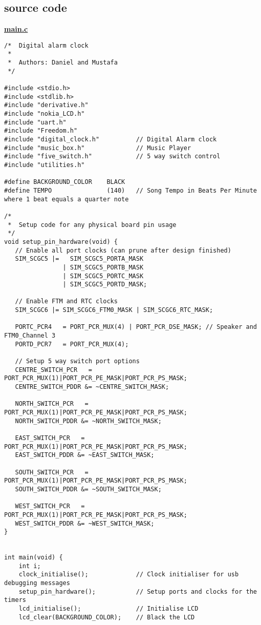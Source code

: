 \documentclass{article}
\begin{document}
\begin{landscape}
\section{source code}
\bf{\underline{main.c}}
\begin{lstlisting}[frame=single]
/*	Digital alarm clock
 * 
 * 	Authors: Daniel and Mustafa
 */

#include <stdio.h>
#include <stdlib.h>
#include "derivative.h"
#include "nokia_LCD.h"
#include "uart.h"
#include "Freedom.h"
#include "digital_clock.h"			// Digital Alarm clock
#include "music_box.h"				// Music Player
#include "five_switch.h"			// 5 way switch control
#include "utilities.h"

#define BACKGROUND_COLOR 	BLACK
#define TEMPO				(140)	// Song Tempo in Beats Per Minute where 1 beat equals a quarter note

/*
 *  Setup code for any physical board pin usage
 */
void setup_pin_hardware(void) {
   // Enable all port clocks (can prune after design finished)
   SIM_SCGC5 |=   SIM_SCGC5_PORTA_MASK
		   	   	| SIM_SCGC5_PORTB_MASK
		   	   	| SIM_SCGC5_PORTC_MASK
		   	   	| SIM_SCGC5_PORTD_MASK;
   
   // Enable FTM and RTC clocks
   SIM_SCGC6 |= SIM_SCGC6_FTM0_MASK | SIM_SCGC6_RTC_MASK;
   
   PORTC_PCR4	= PORT_PCR_MUX(4) | PORT_PCR_DSE_MASK; // Speaker and FTM0_Channel 3
   PORTD_PCR7	= PORT_PCR_MUX(4);
   
   // Setup 5 way switch port options
   CENTRE_SWITCH_PCR   = PORT_PCR_MUX(1)|PORT_PCR_PE_MASK|PORT_PCR_PS_MASK;
   CENTRE_SWITCH_PDDR &= ~CENTRE_SWITCH_MASK;
   
   NORTH_SWITCH_PCR   = PORT_PCR_MUX(1)|PORT_PCR_PE_MASK|PORT_PCR_PS_MASK;
   NORTH_SWITCH_PDDR &= ~NORTH_SWITCH_MASK;   
   
   EAST_SWITCH_PCR   = PORT_PCR_MUX(1)|PORT_PCR_PE_MASK|PORT_PCR_PS_MASK;
   EAST_SWITCH_PDDR &= ~EAST_SWITCH_MASK;
   
   SOUTH_SWITCH_PCR   = PORT_PCR_MUX(1)|PORT_PCR_PE_MASK|PORT_PCR_PS_MASK;
   SOUTH_SWITCH_PDDR &= ~SOUTH_SWITCH_MASK;
   
   WEST_SWITCH_PCR   = PORT_PCR_MUX(1)|PORT_PCR_PE_MASK|PORT_PCR_PS_MASK;
   WEST_SWITCH_PDDR &= ~WEST_SWITCH_MASK;
}


int main(void) {
	int i;
	clock_initialise();				// Clock initialiser for usb debugging messages
	setup_pin_hardware();			// Setup ports and clocks for the timers
	lcd_initialise();				// Initialise LCD
	lcd_clear(BACKGROUND_COLOR);	// Black the LCD


\end{lstlisting}
\end{landscape}
\end{document}
